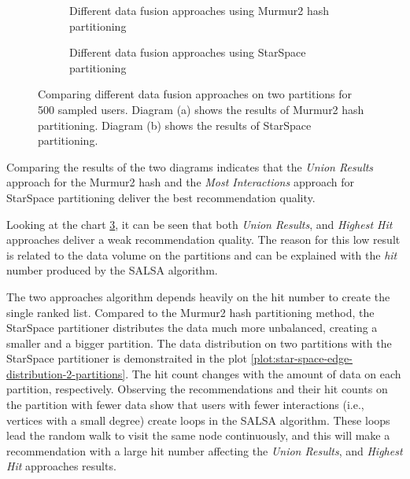 \begin{figure}[!ht]
    \centering
    \begin{subfigure}{\textwidth}
        \centering
        
        \caption{Different data fusion approaches using Murmur2 hash partitioning}
        \label{plot:murmur2-data-fusion}
    \end{subfigure}\qquad

    \begin{subfigure}{\textwidth}
        \centering
        
        \caption{Different data fusion approaches using StarSpace partitioning}
        \label{plot:star-space-data-fusion}
    \end{subfigure}\qquad
    \caption{Comparing different data fusion approaches on two partitions for 500 sampled users. Diagram (a) shows the results of Murmur2 hash partitioning. Diagram (b) shows the results of StarSpace partitioning.}
\end{figure}


Comparing the results of the two diagrams indicates that the \emph{Union Results} approach for the Murmur2 hash and the \emph{Most Interactions} approach for StarSpace partitioning deliver the best recommendation quality. 


Looking at the chart \ref{plot:star-space-data-fusion}, it can be seen that both \emph{Union Results}, and \emph{Highest Hit} approaches deliver a weak recommendation quality. The reason for this low result is related to the data volume on the partitions and can be explained with the \emph{hit} number produced by the SALSA algorithm. 


The two approaches algorithm depends heavily on the hit number to create the single ranked list. Compared to the Murmur2 hash partitioning method, the StarSpace partitioner distributes the data much more unbalanced, creating a smaller and a bigger partition. The data distribution on two partitions with the StarSpace partitioner is demonstraited in the plot \ref{plot:star-space-edge-distribution-2-partitions}. The hit count changes with the amount of data on each partition, respectively. Observing the recommendations and their hit counts on the partition with fewer data show that users with fewer interactions (i.e., vertices with a small degree) create loops in the SALSA algorithm. These loops lead the random walk to visit the same node continuously, and this will make a recommendation with a large hit number affecting the \emph{Union Results}, and \emph{Highest Hit} approaches results.


